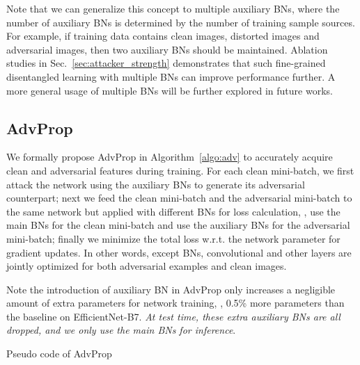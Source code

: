 \documentclass[10pt,twocolumn,letterpaper]{article}
\begin{document}
Note that we can generalize this concept to multiple auxiliary BNs, where the number of auxiliary BNs is determined by the number of training sample sources. For example, if training data contains clean images, distorted images and adversarial images, then two auxiliary BNs should be maintained. Ablation studies in Sec.~\ref{sec:attacker_strength} demonstrates that such fine-grained disentangled learning with  multiple BNs can improve performance further.  A more general usage of multiple BNs will be further explored in future works.


\subsection{AdvProp}
\label{sec:AdvReg}
We formally propose AdvProp in Algorithm~\ref{algo:adv} to accurately acquire clean and adversarial features during training. For each clean mini-batch, we first attack the network using the auxiliary BNs to generate its adversarial counterpart; next we feed the clean mini-batch and the adversarial mini-batch to the same network but applied with different BNs for loss calculation, \ie, use the main BNs for the clean mini-batch and use the auxiliary BNs for the adversarial mini-batch; finally we minimize the total loss w.r.t. the network parameter for gradient updates. In other words, except BNs, convolutional and other layers are jointly optimized for both adversarial examples and clean images. 


Note the introduction of auxiliary BN in AdvProp only increases a negligible amount of extra parameters for network training, \eg, 0.5\% more parameters than the baseline on EfficientNet-B7. \emph{At test time, these extra auxiliary BNs are all dropped, and we only use the main BNs for inference}.


\vspace{-0.9em}
\begin{algorithm}[h!]\small
\DontPrintSemicolon
{}
\KwRet{}
\caption{Pseudo code of AdvProp}
\label{algo:adv}
\end{algorithm}
\vspace{-1em}
\end{document}
